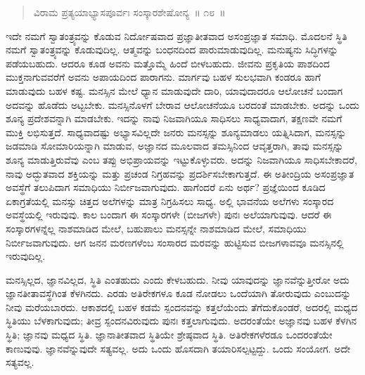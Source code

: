 \vspace{-0.4cm}

\begin{verse}
ವಿರಾಮ ಪ್ರತ್ಯಯಾಭ್ಯಾಸಪೂರ್ವಃ ಸಂಸ್ಕಾರಶೇಷೋನ್ಯ~॥ ೧೮~॥
\end{verse}

\vspace{-0.4cm}


ಇದೇ ನಮಗೆ ಸ್ವಾತಂತ್ರ್ಯವನ್ನು ಕೊಡುವ ನಿರ್ದೋಷವಾದ ಪ್ರಜ್ಞಾತೀತವಾದ ಅಸಂಪ್ರ\break ಜ್ಞಾತ ಸಮಾಧಿ. ಮೊದಲನೆ ಸ್ಥಿತಿ ನಮಗೆ ಸ್ವಾತಂತ್ರ್ಯವನ್ನು ಕೊಡುವುದಿಲ್ಲ. ಆತ್ಮವನ್ನು ಬಂಧನದಿಂದ ಪಾರುಮಾಡುವುದಿಲ್ಲ. ಮನುಷ್ಯನು ಸಿದ್ಧಿಗಳನ್ನು ಪಡೆಯಬಹುದು. ಆದರೂ ಕೂಡ ಅವನು ಮತ್ತೊಮ್ಮೆ ಹಿಂದೆ ಬೀಳಬಹುದು. ಜೀವನು ಪ್ರಕೃತಿಯ ಪಾಶದಿಂದ ಮುಕ್ತನಾಗುವವರೆಗೆ ಅವನು ಅಪಾಯದಿಂದ ಪಾರಾಗನು. ಮಾರ್ಗವು ಬಹಳ ಸುಲಭವಾಗಿ ಕಂಡರೂ ಹಾಗೆ ಮಾಡುವುದು ಬಹಳ ಕಷ್ಟ. ಮನಸ್ಸಿನ ಮೇಲೆ ಧ್ಯಾನ ಮಾಡುವುದೇ ದಾರಿ, ಯಾವುದಾದರೂ ಆಲೋಚನೆ ಬಂದಾಗ ಅದವನ್ನು ಹೊಡೆದು ಅಟ್ಟಬೇಕು. ಮನಸ್ಸಿ\break ನೊಳಗೆ ಬೇರಾವ ಆಲೋಚನೆಯೂ ಬರದಂತೆ ಮಾಡಬೇಕು. ಅದನ್ನು ಒಂದು ಶೂನ್ಯ ಪ್ರದೇಶವನ್ನಾಗಿ ಮಾಡಬೇಕು. ಇದನ್ನು ನಾವು ನಿಜವಾಗಿಯೂ ಸಾಧಿಸಲು ಸಾಧ್ಯವಾದಾಗ, ತಕ್ಷಣವೇ ನಮಗೆ ಮುಕ್ತಿ ಲಭಿಸುತ್ತದೆ. ಸಾಧ್ಯವಾದಷ್ಟು ಅಭ್ಯಾಸವಿಲ್ಲದೇ ಜನರು ಮನಸ್ಸನ್ನು ಶೂನ್ಯಮಾಡಲು ಯತ್ನಿಸಿದಾಗ, ಮನಸ್ಸನ್ನು ಜಡಮಾಡಿ ಸೋಮಾರಿಯನ್ನಾಗಿ ಮಾಡುವ, ಅಜ್ಞಾನದ ಮೂಲವಾದ ತಮಸ್ಸಿನಿಂದ ಆವೃತ್ತರಾಗಿ, ತಾವು ಮನಸ್ಸನ್ನು ಶೂನ್ಯ ಮಾಡುತ್ತಿರುವೆವು ಎಂಬ ತಪ್ಪು ಅಭಿಪ್ರಾಯವನ್ನು ಇಟ್ಟುಕೊಳ್ಳುವರು. ಅದನ್ನು ನಿಜವಾಗಿಯೂ ಸಾಧಿಸಬೇಕಾದರೆ, ನಾವು ಅದ್ಭುತವಾದ ಶಕ್ತಿಯನ್ನು ಮತ್ತು ಪ್ರಚಂಡ ನಿಗ್ರಹವನ್ನು ಪ್ರದರ್ಶಿಸಬೇಕಾಗುತ್ತದೆ. ಈ ಅತೀಂದ್ರಿಯ ಅಸಂಪ್ರಜ್ಞಾತ ಅವಸ್ಥೆಗೆ ತಲುಪಿದಾಗ ಸಮಾಧಿಯು ನಿರ್ಬೀಜವಾಗುವುದು. ಹಾಗೆಂದರೆ ಏನು ಅರ್ಥ? ಪ್ರಜ್ಞೆಯಿಂದ ಕೂಡಿದ ಏಕಾಗ್ರತೆಯಲ್ಲಿ ಮನಸ್ಸು ಚಿತ್ತದ ಅಲೆಗಳನ್ನು ಮಾತ್ರ ನಿಗ್ರಹಿಸಲು ಸಾಧ್ಯ. ಅಲ್ಲಿ ಭಾವನೆಯ ಅಲೆಗಳು ಸಂಸ್ಕಾರದ ಅವಸ್ಥೆಯಲ್ಲಿ ಇರುವುವು. ಕಾಲ ಬಂದಾಗ ಈ ಸಂಸ್ಕಾರಗಳೇ (ಬೀಜಗಳೇ) ಪುನಃ ಅಲೆಯಾಗುವುವು. ಆದರೆ ಈ ಸಂಸ್ಕಾರಗಳನ್ನೆಲ್ಲ ನಾಶಮಾಡಿದ ಮೇಲೆ, ಬಹುಪಾಲು ಮನಸ್ಸನ್ನೇ ನಾಶಮಾಡಿದ ಮೇಲೆ, ಸಮಾಧಿಯು ನಿರ್ಬೀಜವಾಗುವುದು. ಆಗ ಜನನ ಮರಣಗಳೆಂಬ ಸಂಸಾರದ ಮರವನ್ನು ಹುಟ್ಟಿಸುವ ಬೀಜಗಳಾವವೂ ಮನಸ್ಸಿನಲ್ಲಿ ಇರುವುದಿಲ್ಲ. 

ಮನಸ್ಸಿಲ್ಲದ, ಜ್ಞಾನವಿಲ್ಲದ, ಸ್ಥಿತಿ ಎಂತಹುದು ಎಂದು ಕೇಳಬಹುದು. ನೀವು ಯಾವುದನ್ನು ಜ್ಞಾನವೆನ್ನುತ್ತೀರೋ ಅದು ಜ್ಞಾನತೀತಾವಸ್ಥೆಗಿಂತ ಕೆಳಗಿನದು. ಎರಡು ಅತಿರೇಕಗಳೂ ಕೂಡ ನೋಡಲು ಒಂದೆಯಾಗಿ ತೋರುವುದು ಎಂಬುದನ್ನು ನೀವು ಮರೆಯಬಾರದು. ಆಕಾಶದಲ್ಲಿ ಬಹಳ ಕಡಮೆ ಸ್ಪಂದನವನ್ನು ಕತ್ತಲೆಯೆಂದು ತೆಗೆದುಕೊಂಡರೆ, ಅದರಲ್ಲಿ ಮಧ್ಯದ ಸ್ಥಿತಿಯು ಬೆಳಕಾಗುವುದು; ತೀವ್ರ ಸ್ಪಂದನವಿರುವುದು ಪುನಃ ಕತ್ತಲಾಗುವುದು. ಅದರಂತೆಯೇ ಅಜ್ಞಾನವು ಬಹಳ ಕೆಳಗಿನ ಸ್ಥಿತಿ; ಜ್ಞಾನವು ಮಧ್ಯದ ಸ್ಥಿತಿ. ಜ್ಞಾನಾತೀತವಾದ ಸ್ಥಿತಿಯೇ ಶ್ರೇಷ್ಠವಾದ ಸ್ಥಿತಿ. ಅತಿರೇಕಗಳೆರಡೂ ಒಂದರಂತೆಯೇ ಕಾಣುವುವು. ಜ್ಞಾನವೆನ್ನುವುದೇ ಸತ್ಯವಲ್ಲ. ಅದು ಒಂದು ಹೊಸದಾಗಿ ತಯಾರಿಸಲ್ಪಟ್ಟದ್ದು. ಒಂದು ಸಂಯೋಗ. ಅದೇ ಸತ್ಯವಲ್ಲ. 

